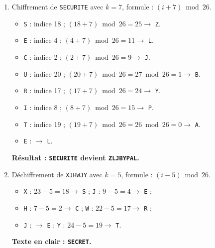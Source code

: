 \documentclass[11pt]{article}
\begin{document}
\begin{corrige}
\begin{enumerate}
\item Chiffrement de \texttt{SECURITE} avec $k = 7$, formule : $(i + 7) \bmod 26$.
\begin{itemize}
\item \texttt{S} : indice 18 ; $(18 + 7) \bmod 26 = 25 \rightarrow$ \texttt{Z}.
\item \texttt{E} : indice 4 ; $(4 + 7) \bmod 26 = 11 \rightarrow$ \texttt{L}.
\item \texttt{C} : indice 2 ; $(2 + 7) \bmod 26 = 9 \rightarrow$ \texttt{J}.
\item \texttt{U} : indice 20 ; $(20 + 7) \bmod 26 = 27 \bmod 26 = 1 \rightarrow$ \texttt{B}.
\item \texttt{R} : indice 17 ; $(17 + 7) \bmod 26 = 24 \rightarrow$ \texttt{Y}.
\item \texttt{I} : indice 8 ; $(8 + 7) \bmod 26 = 15 \rightarrow$ \texttt{P}.
\item \texttt{T} : indice 19 ; $(19 + 7) \bmod 26 = 26 \bmod 26 = 0 \rightarrow$ \texttt{A}.
\item \texttt{E} : $\rightarrow$ \texttt{L}.
\end{itemize}
\textbf{Résultat : \texttt{SECURITE} devient \texttt{ZLJBYPAL}.}
\item Déchiffrement de \texttt{XJHWJY} avec $k = 5$, formule : $(i - 5) \bmod 26$.
\begin{itemize}
\item \texttt{X} : $23 - 5 = 18 \rightarrow$ \texttt{S} ; \quad \texttt{J} : $9 - 5 = 4 \rightarrow$ \texttt{E} ;
\item \texttt{H} : $7 - 5 = 2 \rightarrow$ \texttt{C} ; \quad \texttt{W} : $22 - 5 = 17 \rightarrow$ \texttt{R} ;
\item \texttt{J} : $\rightarrow$ \texttt{E} ; \quad \texttt{Y} : $24 - 5 = 19 \rightarrow$ \texttt{T}.
\end{itemize}
\textbf{Texte en clair : \texttt{SECRET}.}
\end{enumerate}
\end{corrige}
\end{document}
